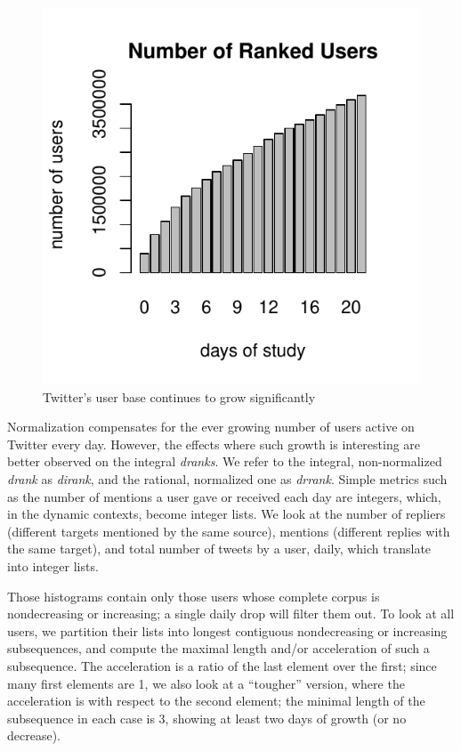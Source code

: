 \documentclass[10pt,oneside]{memoir}
\begin{document}
\begin{figure}
\begin{center}
\includegraphics{figures/daily-users}
\caption{Twitter's user base continues to grow significantly}
\label{figure:daily-users}
\end{center}
\end{figure}
Normalization compensates for the ever growing number of users active on Twitter every day.  However, the effects where such growth is interesting are better observed on the integral {\itshape dranks}.  We refer to the integral, non-normalized {\itshape drank} as {\itshape dirank}, and the rational, normalized one as {\itshape drrank}.
Simple metrics such as the number of mentions a user gave or received each day are integers, which, in the dynamic contexts, become integer lists.  We look at the number of repliers (different targets mentioned by the same source), mentions (different replies with the same target), and total number of tweets by a user, daily, which translate into integer lists.


Those histograms contain only those users whose complete corpus is nondecreasing or increasing; a single daily drop will filter them out.  To look at all users, we partition their lists into longest contiguous nondecreasing or increasing subsequences, and compute the maximal length and/or acceleration of such a subsequence.  The acceleration is a ratio of the last element over the first; since many first elements are 1, we also look at a ``tougher'' version, where the acceleration is with respect to the second element; the minimal length of the subsequence in each case is 3, showing at least two days of growth (or no decrease).
\end{document}
